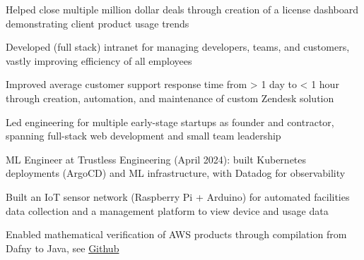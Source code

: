\documentclass[print]{jack-resume}
\begin{document}
\begin{tightemize}
    \item Helped close multiple million dollar deals through creation of a license dashboard demonstrating client product usage trends
    \item Developed (full stack) intranet for managing developers, teams, and customers, vastly improving efficiency of all employees
    \item Improved average customer support response time from > 1 day to < 1 hour through creation, automation, and maintenance of custom Zendesk solution
\end{tightemize}
\sectionsep

\begin{tightemize}
    \item Led engineering for multiple early-stage startups as founder and contractor, spanning full-stack web development and small team leadership
    \item ML Engineer at Trustless Engineering (April 2024): built Kubernetes deployments (ArgoCD) and ML infrastructure, with Datadog for observability
\end{tightemize}
\sectionsep

\begin{tightemize}
    \item Built an IoT sensor network (Raspberry Pi + Arduino) for automated facilities data collection and a management platform to view device and usage data
\end{tightemize}

\begin{tightemize}
    \item Enabled mathematical verification of AWS products through compilation from Dafny to Java, see \href{https://github.com/dafny-lang/dafny}{Github \ExternalLink}
\end{tightemize}
\sectionsep
\end{document}
